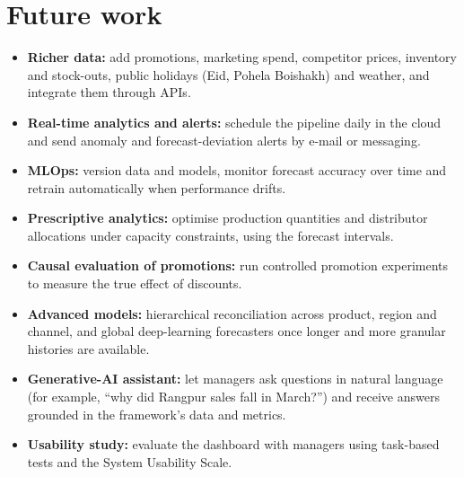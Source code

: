 \section{Future work}
\begin{itemize}
  \item \textbf{Richer data:} add promotions, marketing spend, competitor prices, inventory and stock-outs,
        public holidays (Eid, Pohela Boishakh) and weather, and integrate them through APIs.
  \item \textbf{Real-time analytics and alerts:} schedule the pipeline daily in the cloud and send anomaly and
        forecast-deviation alerts by e-mail or messaging.
  \item \textbf{MLOps:} version data and models, monitor forecast accuracy over time and retrain automatically
        when performance drifts.
  \item \textbf{Prescriptive analytics:} optimise production quantities and distributor allocations under
        capacity constraints, using the forecast intervals.
  \item \textbf{Causal evaluation of promotions:} run controlled promotion experiments to measure the true
        effect of discounts.
  \item \textbf{Advanced models:} hierarchical reconciliation across product, region and channel, and global
        deep-learning forecasters once longer and more granular histories are available.
  \item \textbf{Generative-AI assistant:} let managers ask questions in natural language (for example,
        ``why did Rangpur sales fall in March?'') and receive answers grounded in the framework's data and metrics.
  \item \textbf{Usability study:} evaluate the dashboard with managers using task-based tests and the System
        Usability Scale.
\end{itemize}

